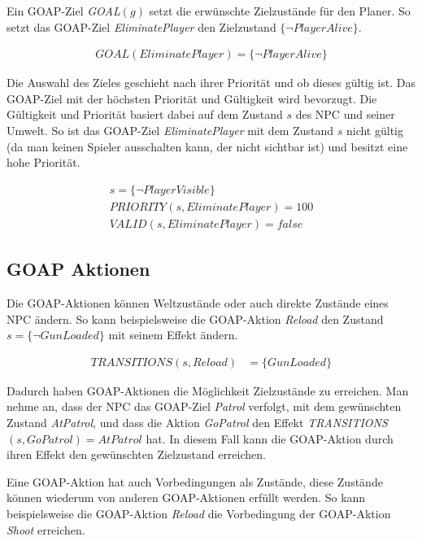 Ein GOAP-Ziel \textit{GOAL}$(g)$ setzt die erw\"{u}nschte Zielzust\"{a}nde f\"{u}r den Planer. So setzt das GOAP-Ziel \textit{EliminatePlayer} den Zielzustand $\{\lnot \textit{PlayerAlive}\}$.

\begin{align}
	\textit{GOAL}(\textit{EliminatePlayer}) = \{\lnot \textit{PlayerAlive}\}
\end{align}


Die Auswahl des Zieles geschieht nach ihrer Priorit\"{a}t und ob dieses g\"{u}ltig ist. Das GOAP-Ziel mit der h\"{o}chsten Priorit\"{a}t und G\"{u}ltigkeit wird bevorzugt. Die G\"{u}ltigkeit und Priorit\"{a}t basiert dabei auf dem Zustand $s$ des NPC und seiner Umwelt. So ist das GOAP-Ziel \textit{EliminatePlayer} mit dem Zustand $s$ nicht g\"{u}ltig (da man keinen Spieler ausschalten kann, der nicht sichtbar ist) und besitzt eine hohe Priorit\"{a}t.

\begin{align}
	s = \{\lnot \textit{PlayerVisible}\} \\
	\textit{PRIORITY}(s,\textit{EliminatePlayer}) = 100 \\
	\textit{VALID}(s,\textit{EliminatePlayer}) = \textit{false}
\end{align}


\subsection{GOAP Aktionen}
\label{chap:goap actions}

Die GOAP-Aktionen k\"{o}nnen Weltzust\"{a}nde oder auch direkte Zust\"{a}nde eines NPC \"{a}ndern. So kann beispielsweise die GOAP-Aktion \textit{Reload} den Zustand $s = \{\lnot \textit{GunLoaded}\}$ mit seinem Effekt \"{a}ndern.

\begin{align}
	\textit{TRANSITIONS}(s,\textit{Reload}) &= \{\textit{GunLoaded}\}
\end{align}


Dadurch haben GOAP-Aktionen die M\"{o}glichkeit Zielzust\"{a}nde zu erreichen. Man nehme an, dass der NPC das GOAP-Ziel \textit{Patrol} verfolgt, mit dem gew\"{u}nschten Zustand \textit{AtPatrol}, und dass die Aktion \textit{GoPatrol} den Effekt \textit{TRANSITIONS}$(s, \textit{GoPatrol}) = {\textit{AtPatrol}}$ hat. In diesem Fall kann die GOAP-Aktion durch ihren Effekt den gew\"{u}nschten Zielzustand erreichen.

Eine GOAP-Aktion hat auch Vorbedingungen als Zust\"{a}nde, diese Zust\"{a}nde k\"{o}nnen wiederum von anderen GOAP-Aktionen erf\"{u}llt werden. So kann beispielsweise die GOAP-Aktion \textit{Reload} die Vorbedingung der GOAP-Aktion \textit{Shoot} erreichen.

